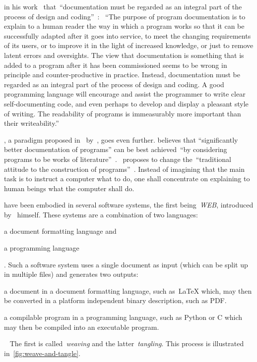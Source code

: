 \documentclass[%
    a4paper,    %
    justified,  %
    nobib,      %
    openany     %
]{tufte-book}
\begin{document}
 in his
work~ that~\enquote{documentation must be regarded as
an integral part of the process of design and coding}~\cite[p.
195]{hoare-hpl-1973}: ~\enquote{The purpose of program documentation is to
explain to a human reader the way in which a program works so that it can be
successfully adapted after it goes into service, to meet the changing
requirements of its users, or to improve it in the light of increased knowledge,
or just to remove latent errors and oversights. The view that documentation is
something that is added to a program after it has been commissioned seems to be
wrong in principle and counter-productive in practice. Instead, documentation
must be regarded as an integral part of the process of design and coding. A good
programming language will encourage and assist the programmer to write clear
self-documenting code, and even perhaps to develop and display a pleasant style
of writing. The readability of programs is immeasurably more important than
their writeability.}~\cite[p. 195]{hoare-hpl-1973}

, a paradigm proposed
in~\citeyear{knuth-lp-1984} by~\citeauthor{knuth-lp-1984}, goes even further.
\citeauthor{knuth-lp-1984} believes that \enquote{significantly better
documentation of programs} can be best achieved~\enquote{by considering programs
to be works of literature}~\cite[p.
1]{knuth-lp-1984}.~\citeauthor{knuth-lp-1984} proposes to change
the~\enquote{traditional attitude to the construction of programs}~\cite[p.
1]{knuth-lp-1984}. Instead of imagining that the main task is to instruct a
computer what to do, one shall concentrate on explaining to human beings what
the computer shall do.~\cite[p. 1]{knuth-lp-1984}

 have been embodied in several
software systems, the first being~\emph{WEB}, introduced
by~\citeauthor{knuth-lp-1984} himself. These systems are a combination of two
languages:
\begin{enumerate*}
  \item a document formatting language and
  \item a programming language
\end{enumerate*}.
Such a software system uses a single document as input (which can be split up in
multiple files) and generates two outputs:
\begin{enumerate*}
\item a document in a document formatting language, such as~\LaTeX{} which, may
    then be converted in a platform independent binary description, such as
    PDF.
  \item a compilable program in a programming language, such as Python or C
    which may then be compiled into an executable program.
\end{enumerate*}~\cite{knuth-lp-1984}
The first is called~\emph{weaving} and the latter~\emph{tangling}. This process
is illustrated in~\autoref{fig:weave-and-tangle}.
\end{document}
